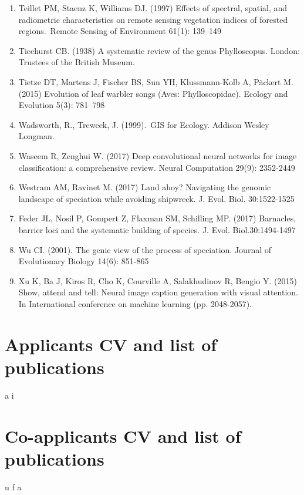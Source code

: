 \documentclass[11pt,a4paper]{article}
\begin{document}
\begin{enumerate}
\item Teillet PM, Staenz K, Williams DJ. (1997) Effects of spectral, spatial, and radiometric characteristics on remote sensing vegetation indices of forested regions. Remote Sensing of Environment 61(1): 139–149
\item Ticehurst CB. (1938) A systematic review of the genus Phylloscopus. London: Trustees of the British Museum.
\item Tietze DT, Martens J, Fischer BS, Sun YH, Klussmann-Kolb A, Päckert M. (2015) Evolution of leaf warbler songs (Aves: Phylloscopidae). Ecology and Evolution 5(3): 781–798
\item Wadsworth, R., Treweek, J. (1999). GIS for Ecology. Addison Wesley Longman.
\item Waseem R, Zenghui W. (2017) Deep convolutional neural networks for image classification: a comprehensive review. Neural Computation 29(9): 2352-2449
\item Westram AM, Ravinet M. (2017) Land ahoy? Navigating the genomic landscape of 
speciation while avoiding shipwreck. J. Evol. Biol. 30:1522-1525
\item Feder JL, Nosil P, Gompert Z, Flaxman SM, Schilling MP. (2017) Barnacles, barrier loci and the systematic building of species. J. Evol. Biol.30:1494-1497
\item Wu CI. (2001). The genic view of the process of speciation. Journal of Evolutionary Biology 14(6): 851-865
\item Xu K, Ba J, Kiros R, Cho K, Courville A, Salakhudinov R, Bengio Y. (2015) Show, attend and tell: Neural image caption generation with visual attention. In International conference on machine learning (pp. 2048-2057).
\end{enumerate} 


\newpage

\section{Applicants CV and list of publications}
a
\newpage
i
\newpage
\section{Co-applicants CV and list of publications}
u
\newpage
f
\newpage
a
\newpage
\end{document}
